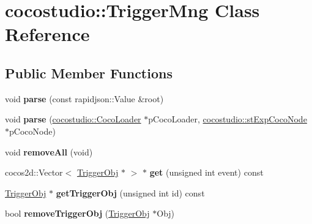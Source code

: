 \hypertarget{classcocostudio_1_1TriggerMng}{}\section{cocostudio\+:\+:Trigger\+Mng Class Reference}
\label{classcocostudio_1_1TriggerMng}
\subsection*{Public Member Functions}
\begin{DoxyCompactItemize}
\item 
\mbox{\label{classcocostudio_1_1TriggerMng_a277b67937d5227891d70bce3e8317431}} 
void {\bfseries parse} (const rapidjson\+::\+Value \&root)
\item 
\mbox{\label{classcocostudio_1_1TriggerMng_aff20409b15b820963afd94a7c3990118}} 
void {\bfseries parse} (\hyperlink{classcocostudio_1_1CocoLoader}{cocostudio\+::\+Coco\+Loader} $\ast$p\+Coco\+Loader, \hyperlink{structcocostudio_1_1stExpCocoNode}{cocostudio\+::st\+Exp\+Coco\+Node} $\ast$p\+Coco\+Node)
\item 
\mbox{\label{classcocostudio_1_1TriggerMng_a001ae442f3f05c0423129b7d6e246ff1}} 
void {\bfseries remove\+All} (void)
\item 
\mbox{\label{classcocostudio_1_1TriggerMng_a8b9f6a68a0c48d414b9e55e2ca6835c3}} 
cocos2d\+::\+Vector$<$ \hyperlink{classcocostudio_1_1TriggerObj}{Trigger\+Obj} $\ast$ $>$ $\ast$ {\bfseries get} (unsigned int event) const
\item 
\mbox{\label{classcocostudio_1_1TriggerMng_a5becc94944f8a04736da939aa62e286c}} 
\hyperlink{classcocostudio_1_1TriggerObj}{Trigger\+Obj} $\ast$ {\bfseries get\+Trigger\+Obj} (unsigned int id) const
\item 
\mbox{\label{classcocostudio_1_1TriggerMng_aaafcd9f8d97d7b41443cf8308eecd74a}} 
bool {\bfseries remove\+Trigger\+Obj} (\hyperlink{classcocostudio_1_1TriggerObj}{Trigger\+Obj} $\ast$Obj)
\item 
\mbox{\label{classcocostudio_1_1TriggerMng_a160631d4cdd69ebbcc247b8caf427ba2}} 

\end{DoxyCompactItemize}
